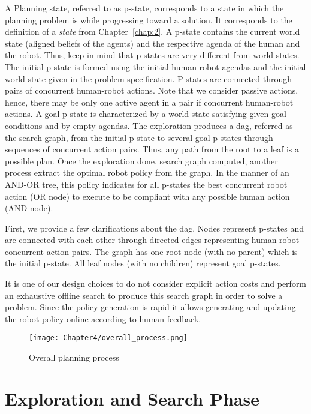 A Planning state, referred to as p-state, corresponds to a state in which the planning problem is while progressing toward a solution. It corresponds to the definition of a \textit{state} from Chapter~\ref{chap:2}. A p-state contains the current world state (aligned beliefs of the agents) and the respective agenda of the human and the robot. Thus, keep in mind that p-states are very different from world states.
The initial p-state is formed using the initial human-robot agendas and the initial world state given in the problem specification. P-states are connected through pairs of concurrent human-robot actions. Note that we consider passive actions, hence, there may be only one active agent in a pair if concurrent human-robot actions. A goal p-state is characterized by a world state satisfying given goal conditions and by empty agendas.
The exploration produces a \acrfull{dag}, referred as the search graph, from the initial p-state to several goal p-states through sequences of concurrent action pairs. Thus, any path from the root to a leaf is a possible plan. Once the exploration done, search graph computed, another process extract the optimal robot policy from the graph. In the manner of an AND-OR tree, this policy indicates for all p-states the best concurrent robot action (OR node) to execute to be compliant with any possible human action (AND node).


First, we provide a few clarifications about the \acrshort{dag}. Nodes represent p-states and are connected with each other through directed edges representing human-robot concurrent action pairs. The graph has one root node (with no parent) which is the initial p-state. All leaf nodes (with no children) represent goal p-states. 

It is one of our design choices to do not consider explicit action costs and perform an exhaustive offline search to produce this search graph in order to solve a problem. Since the policy generation is rapid it allows generating and updating the robot policy online according to human feedback. 


\begin{figure}
    \texttt{[image: Chapter4/overall\_process.png]}
    \caption{Overall planning process}
    \label{fig:overall_process}
\end{figure}

\section{Exploration and Search Phase}

